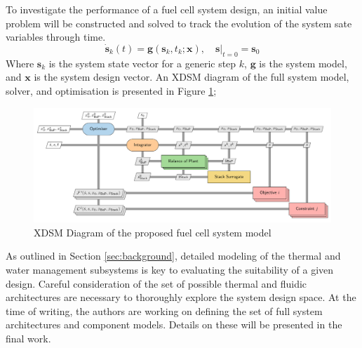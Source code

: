 To investigate the performance of a fuel cell system design, an initial value problem will be constructed and solved to track the evolution of the system sate variables through time.
\begin{equation}
	\dot{\bm{s}}_k(t) = \bm{g}(\bm{s}_k, t_k; \bm{x}), \quad \bm{s}|_{t=0} = \bm{s}_0
\end{equation}
Where \(\bm{s}_k\) is the system state vector for a generic step \(k\), \(\bm{g}\) is the system model, and \(\bm{x}\) is the system design vector. An XDSM diagram of the full system model, solver, and optimisation is presented in Figure \ref{fig:xdsm};
\begin{center}
	\begin{figure}[h]
		\includegraphics[width=\linewidth]{figures/xdsm.pdf}
		\caption{XDSM Diagram of the proposed fuel cell system model}
		\label{fig:xdsm}
	\end{figure}
\end{center}
As outlined in Section \ref{sec:background}, detailed modeling of the thermal and water management subsystems is key to evaluating the suitability of a given design.
Careful consideration of the set of possible thermal and fluidic architectures are necessary to thoroughly explore the system design space.
At the time of writing, the authors are working on defining the set of full system architectures and component models.
Details on these will be presented in the final work.

